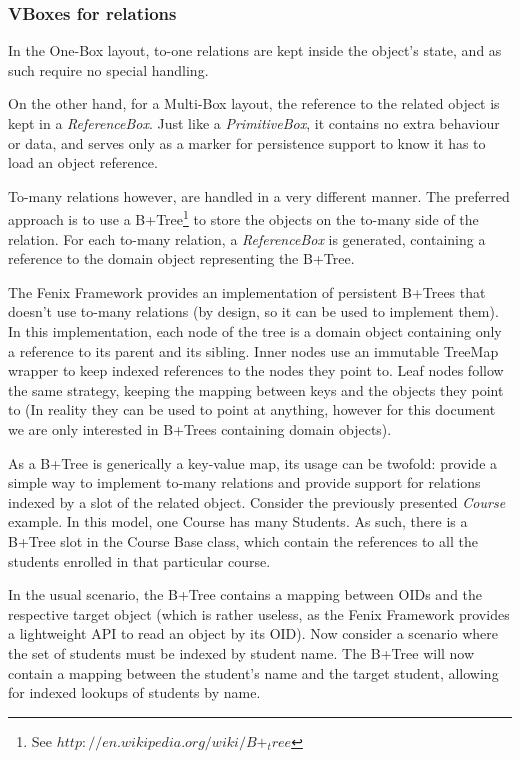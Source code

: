\subsubsection{VBoxes for relations}

In the One-Box layout, to-one relations are kept inside the object's
state, and as such require no special handling. 

On the other hand, for a Multi-Box layout, the reference to the
related object is kept in a {\it ReferenceBox}. Just like a {\it
  PrimitiveBox}, it contains no extra behaviour or data, and serves
only as a marker for persistence support to know it has to load an
object reference.

To-many relations however, are handled in a very different manner. The
preferred approach is to use a B+Tree\footnote{See
  $http://en.wikipedia.org/wiki/B+_tree$} to store the objects on the
to-many side of the relation. For each to-many relation, a {\it
  ReferenceBox} is generated, containing a reference to the domain
object representing the B+Tree.

The Fenix Framework provides an implementation of persistent B+Trees
that doesn't use to-many relations (by design, so it can be used to
implement them). In this implementation, each node of the tree is a
domain object containing only a reference to its parent and its
sibling. Inner nodes use an immutable TreeMap wrapper to keep indexed
references to the nodes they point to. Leaf nodes follow the same
strategy, keeping the mapping between keys and the objects they point
to (In reality they can be used to point at anything, however for this
document we are only interested in B+Trees containing domain objects).

As a B+Tree is generically a key-value map, its usage can be twofold:
provide a simple way to implement to-many relations and provide
support for relations indexed by a slot of the related
object. Consider the previously presented {\it Course} example. In
this model, one Course has many Students. As such, there is a B+Tree
slot in the Course Base class, which contain the references to all the
students enrolled in that particular course.

In the usual scenario, the B+Tree contains a mapping between OIDs and
the respective target object (which is rather useless, as the Fenix
Framework provides a lightweight API to read an object by its OID).
Now consider a scenario where the set of students must be indexed by
student name. The B+Tree will now contain a mapping between the
student's name and the target student, allowing for indexed lookups of
students by name.

